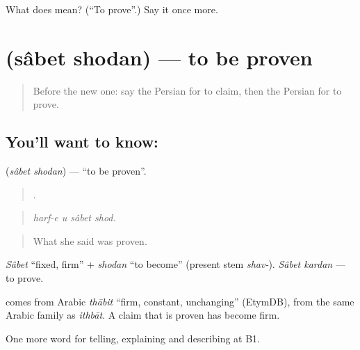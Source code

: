 \begin{tcolorbox}[breakable,colback=teal!4,colframe=teal!35!black,title={Before you move on}]
What does   mean? (\textquotedblleft{}To prove\textquotedblright{}.) Say it once more.
\end{tcolorbox}
\section[\texorpdfstring{\fa{ثابت} \fa{شدن} (sâbet shodan)}{ثابت شدن (sâbet shodan)}]{  (sâbet shodan) — to be proven}

\label{lesson:FA-C363-sabet-shodan}



\begin{quote}
Before the new one: say the Persian for to claim, then the Persian for to prove.
\end{quote}

\subsection*{You'll want to know:  }
\textbf{ } (\emph{sâbet shodan}) — \textquotedblleft{}to be proven\textquotedblright{}.

\begin{quote}
   .
\end{quote}

\begin{quote}
\emph{harf-e u sâbet shod.}
\end{quote}

\begin{quote}
What she said was proven.
\end{quote}

\emph{Sâbet} \textquotedblleft{}fixed, firm\textquotedblright{} + \emph{shodan} \textquotedblleft{}to become\textquotedblright{} (present stem \emph{shav-}). \emph{Sâbet kardan} — to prove.

\begin{cousinweb}
\textbf{} comes from Arabic \emph{thābit} \textquotedblleft{}firm, constant, unchanging\textquotedblright{} (EtymDB), from the same Arabic family as \emph{ithbāt}. A claim that is proven has become firm.
\end{cousinweb}

\begin{grammarlens}[title={What you've built}]
One more word for telling, explaining and describing at B1.
\end{grammarlens}

